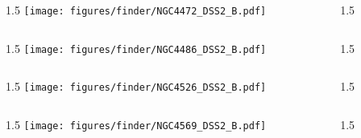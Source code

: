 \documentclass[final]{beamer}
\newlength{\colwidth}
\begin{document}

\begin{frame}[t]{}
    \begin{columns}[T]
        \begin{column}{1.5\colwidth}
            \centering
            \texttt{[image: figures/finder/NGC4472\_DSS2\_B.pdf]}
        \end{column}
        \begin{column}{1.5\colwidth}
            \Large
            
        \end{column}
    \end{columns}
    \vspace{\fill}
    \begin{columns}[T]
        \begin{column}{1.5\colwidth}
            \centering
            \texttt{[image: figures/finder/NGC4486\_DSS2\_B.pdf]}
        \end{column}
        \begin{column}{1.5\colwidth}
            \Large
            
        \end{column}
    \end{columns}
\end{frame}


\begin{frame}[t]{}
    \begin{columns}[T]
        \begin{column}{1.5\colwidth}
            \centering
            \texttt{[image: figures/finder/NGC4526\_DSS2\_B.pdf]}
        \end{column}
        \begin{column}{1.5\colwidth}
            \Large
            
        \end{column}
    \end{columns}
    \vspace{\fill}
    \begin{columns}[T]
        \begin{column}{1.5\colwidth}
            \centering
            \texttt{[image: figures/finder/NGC4569\_DSS2\_B.pdf]}
        \end{column}
        \begin{column}{1.5\colwidth}
            \Large
            
        \end{column}
    \end{columns}
\end{frame}
\end{document}
